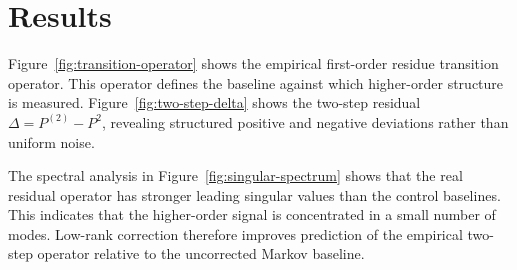 \section{Results}

Figure~\ref{fig:transition-operator} shows the empirical first-order residue transition operator. This operator defines the baseline against which higher-order structure is measured. Figure~\ref{fig:two-step-delta} shows the two-step residual $\Delta=P^{(2)}-P^2$, revealing structured positive and negative deviations rather than uniform noise.

The spectral analysis in Figure~\ref{fig:singular-spectrum} shows that the real residual operator has stronger leading singular values than the control baselines. This indicates that the higher-order signal is concentrated in a small number of modes. Low-rank correction therefore improves prediction of the empirical two-step operator relative to the uncorrected Markov baseline.

